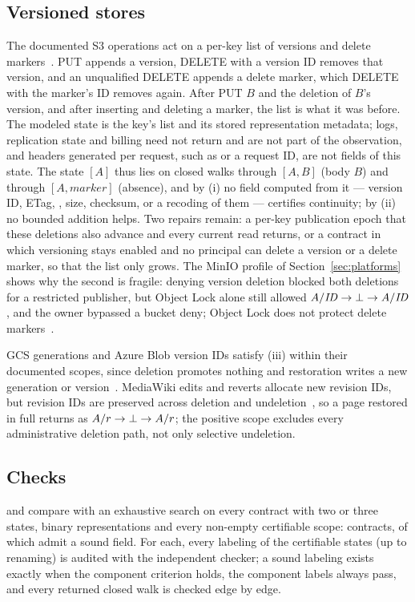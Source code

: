 \subsection{Versioned stores}
The documented S3 operations act on a per-key list of versions and delete
markers~\cite{s3restore}. PUT appends a version, DELETE with a version ID
removes that version, and an unqualified DELETE appends a delete marker, which
DELETE with the marker's ID removes again. After PUT $B$ and the deletion of
$B$'s version, and after inserting and deleting a marker, the list is what it
was before. The modeled state is the key's list and its stored representation
metadata; logs, replication state and billing need not return and are not
part of the observation, and headers generated per request, such as
 or a request ID, are not fields of this state. The state $[A]$ thus
lies on closed walks through $[A,B]$ (body $B$) and through $[A,\mathit{marker}]$
(absence), and by (i) no field computed from it --- version ID, ETag,
, size, checksum, or a recoding of them --- certifies
continuity; by (ii) no bounded addition helps. Two repairs remain: a per-key
publication epoch that these deletions also advance and every current read
returns, or a contract in which versioning stays enabled and no principal can
delete a version or a delete marker, so that the list only grows. The MinIO
profile of Section~\ref{sec:platforms} shows why the second is fragile:
denying version deletion blocked both deletions for a restricted publisher,
but Object Lock alone still allowed $A/\mathit{ID}\to\bot\to A/\mathit{ID}$, and
the owner bypassed a bucket deny; Object Lock does not protect delete
markers~\cite{s3lock}.

GCS generations and Azure Blob version IDs satisfy (iii) within their
documented scopes, since deletion promotes nothing and restoration writes a
new generation or version~\cite{gcsversioning,azureversioning}. MediaWiki
edits and reverts allocate new revision IDs, but revision IDs are preserved
across deletion and undeletion~\cite{mediawikirevision}, so a page restored in
full returns as $A/r\to\bot\to A/r$; the positive scope excludes every
administrative deletion path, not only selective undeletion.

\subsection{Checks}
 and 
compare  with an exhaustive search on every contract with two
or three states, binary representations and every non-empty certifiable
scope: \sRepairChecks{} contracts, \sRepairSound{} of which admit a sound field.
For each, every labeling of the certifiable states (up to renaming) is audited
with the independent checker; a sound labeling exists exactly when the
component criterion holds, the component labels always pass, and every
returned closed walk is checked edge by edge.


